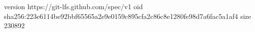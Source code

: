 version https://git-lfs.github.com/spec/v1
oid sha256:223e6114be92bbf65565a2e9e0159c895cfa2c86c8e1280fe98d7a6fac5a1af4
size 230892
